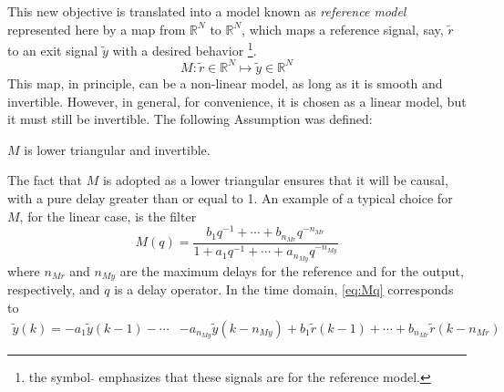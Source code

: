 This new objective is translated into a model known as \textit{reference model} represented here by a map from $\mathbb{R}^{N}$ to $\mathbb{R}^{N}$, which maps a reference signal, say, $\tilde{r}$ to an exit signal $\tilde{y}$ with a desired behavior \footnote{the symbol $\tilde{}$ emphasizes that these signals are for the reference model.}.
\begin{equation}
   M:\tilde{r} \in \mathbb{R}^N \mapsto \tilde{y} \in \mathbb{R}^N
\label{eq:Mmap}
\end{equation}
This map, in principle, can be a non-linear model, as long as it is smooth and invertible. However, in general, for convenience, it is chosen as a linear model, but it must still be invertible. The following Assumption was defined:
\begin{assum}
   $M$ is lower triangular and invertible.
\end{assum}
The fact that $M$ is adopted as a lower triangular ensures that it will be causal, with a pure delay greater than or equal to 1.
An example of a typical choice for $M$, for the linear case, is the filter
\begin{equation}
   M(q)=\frac{b_{1} q^{-1}+\cdots+b_{n_{M r}} q^{-n_{M r}}}{1+a_{1} q^{-1}+\cdots+a_{n_{M y}} q^{-n_{M y}}}
\label{eq:Mq}
\end{equation}
where $n_{Mr}$ and $n_{My}$ are the maximum delays for the reference and for the output, respectively, and $q$ is a delay operator. In the time domain, \eqref{eq:Mq} corresponds to
\begin{align}
   \label{eq:ytMr}
   \tilde{y}(k)=-a_{1} \tilde{y}(k-1)-\cdots &-a_{n_{M y}} \tilde{y}\left(k-n_{M y}\right) +b_{1} \tilde{r}(k-1)+\cdots+b_{n_{M r}} \tilde{r}\left(k-n_{M r}\right)
\end{align}

